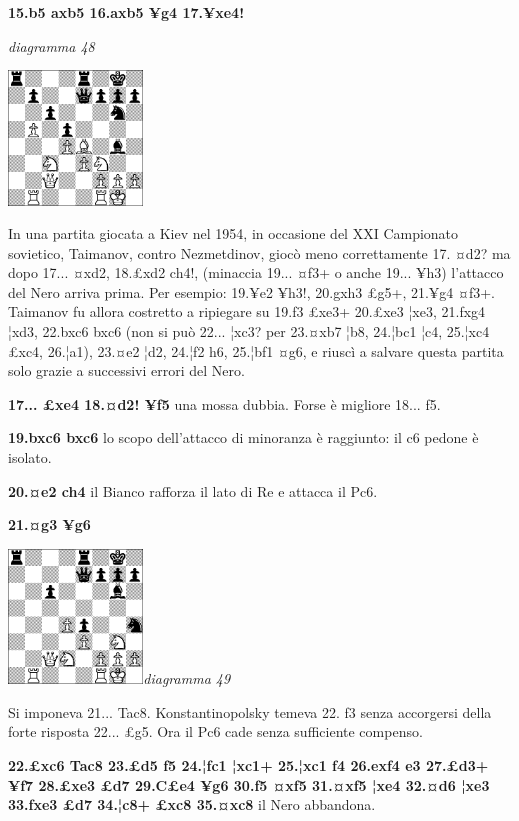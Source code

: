 \documentclass[
]{article}
\begin{document}
\textbf{15.b5 axb5 16.axb5 ¥g4 17.¥xe4!}

\emph{diagramma 48}

\includegraphics[width=1.40972in,height=1.40972in]{vertopal_109f12be458a423d8f3cc838880eaea2/media/image48.png}

In una partita giocata a Kiev nel 1954, in occasione del XXI Campionato
sovietico, Taimanov, contro Nezmetdinov, giocò meno correttamente 17.
¤d2? ma dopo 17... ¤xd2, 18.£xd2 ch4!, (minaccia 19... ¤f3+ o anche
19... ¥h3) l'attacco del Nero arriva prima. Per esempio: 19.¥e2 ¥h3!,
20.gxh3 £g5+, 21.¥g4 ¤f3+. Taimanov fu allora costretto a ripiegare su
19.f3 £xe3+ 20.£xe3 ¦xe3, 21.fxg4 ¦xd3, 22.bxc6 bxc6 (non si può 22...
¦xc3? per 23.¤xb7 ¦b8, 24.¦bc1 ¦c4, 25.¦xc4 £xc4, 26.¦a1), 23.¤e2 ¦d2,
24.¦f2 h6, 25.¦bf1 ¤g6, e riuscì a salvare questa partita solo grazie a
successivi errori del Nero.

\textbf{17... £xe4 18.¤d2! ¥f5} una mossa dubbia. Forse è migliore 18...
f5.

\textbf{19.bxc6 bxc6} lo scopo dell'attacco di minoranza è raggiunto: il
c6 pedone è isolato.

\textbf{20.¤e2 ch4} il Bianco rafforza il lato di Re e attacca il Pc6.

\textbf{21.¤g3 ¥g6}

\includegraphics[width=1.40972in,height=1.40972in]{vertopal_109f12be458a423d8f3cc838880eaea2/media/image49.png}\emph{diagramma
49}

Si imponeva 21... Tac8. Konstantinopolsky temeva 22. f3 senza accorgersi
della forte risposta 22... £g5. Ora il Pc6 cade senza sufficiente
compenso.

\textbf{22.£xc6 Tac8 23.£d5 f5 24.¦fc1 ¦xc1+ 25.¦xc1 f4 26.exf4 e3
27.£d3+ ¥f7 28.£xe3 £d7 29.C£e4 ¥g6 30.f5 ¤xf5 31.¤xf5 ¦xe4 32.¤d6 ¦xe3
33.fxe3 £d7 34.¦c8+ £xc8 35.¤xc8} il Nero abbandona.
\end{document}
